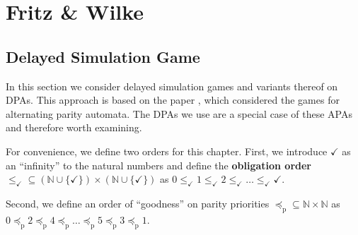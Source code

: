 
\section{Fritz \& Wilke}

\subsection{Delayed Simulation Game}
In this section we consider delayed simulation games and variants thereof on DPAs. This approach is based on the paper \cite{}, which considered the games for alternating parity automata. The DPAs we use are a special case of these APAs and therefore worth examining.

\begin{defn}
	For convenience, we define two orders for this chapter. First, we introduce $\checkmark$ as an \enquote{infinity} to the natural numbers and define the \textbf{obligation order} $\leq_\checkmark \subseteq (\mathbb{N} \cup \{\checkmark\}) \times (\mathbb{N} \cup \{\checkmark\})$ as $0 \leq_\checkmark 1 \leq_\checkmark 2 \leq_\checkmark \dots \leq_\checkmark \checkmark$.
	
	Second, we define an order of \enquote{goodness} on parity priorities $\preceq_\text{p} \subseteq \mathbb{N} \times \mathbb{N}$ as $0 \preceq_\text{p} 2 \preceq_\text{p} 4 \preceq_\text{p} \dots \preceq_\text{p} 5 \preceq_\text{p} 3 \preceq_\text{p} 1$.
\end{defn}

